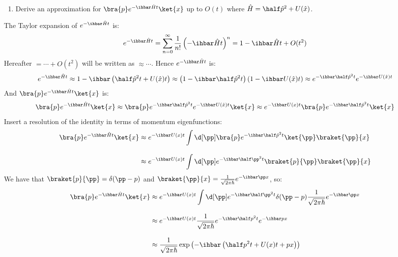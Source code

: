 \begin{enumerate}[leftmargin=0cm]
  \item Derive an approximation for $\bra{p} e^{-\ihbar \hat{H} t} \ket{x}$
        up to $O(t)$ where $\hat{H} = \half \hat{p}^2 + U(\hat{x})$.
\end{enumerate}

The Taylor expansion of $e^{-\ihbar \hat{H} t}$ is:
\begin{equation*}
  e^{-\ihbar \hat{H}t}
  = \sum_{n=0}^{\infty} \frac{1}{n!} \left( -\ihbar \hat{H} t \right)^n
  = 1 - \ihbar\hat{H}t + O(t^2)
\end{equation*}
Hereafter $=\cdots + O(t^2)$ will be written as $\approx\cdots$.
Hence $e^{-\ihbar \hat{H}t}$ is:
\begin{equation*}
  e^{-\ihbar \hat{H}t}
  \approx 1 - \ihbar \left( \half \hat{p}^2 t + U(\hat{x}) t \right)
  \approx \left(1 - \ihbar \half \hat{p}^2 t \right)\left(1 - \ihbar U(\hat{x}) t\right)
  \approx e^{-\ihbar \half \hat{p}^2 t}e^{-\ihbar U(\hat{x}) t}
\end{equation*}
And $\bra{p}e^{-\ihbar \hat{H}t}\ket{x}$ is:
\begin{equation*}
  \bra{p}e^{-\ihbar \hat{H}t}\ket{x}
  \approx \bra{p} e^{-\ihbar \half \hat{p}^2 t} e^{-\ihbar U(\hat{x}) t} \ket{x}
  \approx e^{-\ihbar U(x) t} \bra{p} e^{-\ihbar \half \hat{p}^2 t} \ket{x}
\end{equation*}
Insert a resolution of the identity in terms of momentum eigenfunctions:
\begin{align*}
  \bra{p}e^{-\ihbar \hat{H}t}\ket{x}
   & \approx e^{-\ihbar U(x) t}\int\d[\pp] \bra{p} e^{-\ihbar \half \hat{p}^2 t} \ket{\pp} \braket{\pp}{x}
  \\[2ex]
   & \approx e^{-\ihbar U(x) t}\int\d[\pp] e^{-\ihbar \half \pp^2 t} \braket{p}{\pp} \braket{\pp}{x}
\end{align*}
We have that $\braket{p}{\pp} = \delta(\pp-p)$ and $\braket{\pp}{x} = \frac{1}{\sqrt{2 \pi \hbar}}e^{-\ihbar \pp x}$, so:
\begin{align*}
  \bra{p}e^{-\ihbar \hat{H}t}\ket{x}
   & \approx e^{-\ihbar U(x) t}\int\d[\pp] e^{-\ihbar \half \pp^2 t} \delta(\pp-p) \frac{1}{\sqrt{2 \pi \hbar}}e^{-\ihbar \pp x}
  \\[2ex]
   & \approx e^{-\ihbar U(x) t} \frac{1}{\sqrt{2 \pi \hbar}} e^{-\ihbar \half p^2 t} e^{-\ihbar p x}
  \\[2ex]
   & \approx \frac{1}{\sqrt{2 \pi \hbar}} \exp\left( -\ihbar \left( \half p^2 t + U(x) t + p x \right) \right)
\end{align*}
